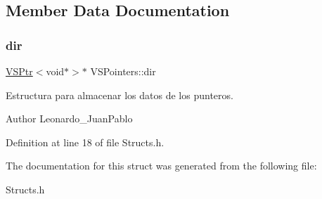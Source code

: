 \subsection{Member Data Documentation}
\mbox{\label{struct_v_s_pointers_aea8397b023eff4e5652f02d17e4bd2b6}} 
\subsubsection{\texorpdfstring{dir}{dir}}
{\footnotesize\ttfamily \hyperlink{class_v_s_ptr}{V\+S\+Ptr}$<$void$\ast$$>$$\ast$ V\+S\+Pointers\+::dir}



Estructura para almacenar los datos de los punteros. 

\begin{DoxyAuthor}{Author}
Leonardo\+\_\+\+Juan\+Pablo 
\end{DoxyAuthor}


Definition at line 18 of file Structs.\+h.



The documentation for this struct was generated from the following file\+:\begin{DoxyCompactItemize}
\item 
Structs.\+h\end{DoxyCompactItemize}
